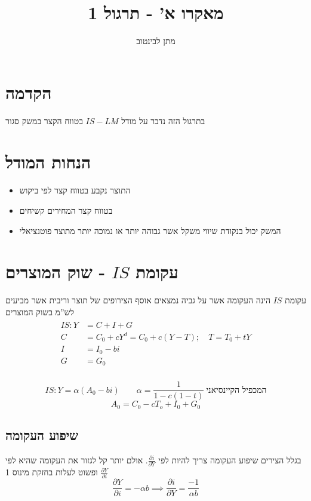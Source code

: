 \documentclass[a4paper,11pt]{article}
\title{מאקרו א' - תרגול 1}
\author{מתן לבינטוב}
\date{}
\begin{document}
\begin{RTL}
    
\maketitle
\section{הקדמה}
בתרגול הזה נדבר על מודל $IS-LM$  בטווח הקצר במשק סגור 
\section{הנחות המודל}
\begin{itemize}
    \item התוצר נקבע בטווח קצר לפי ביקוש
    \item בטווח קצר המחירים קשיחים
    \item המשק יכול בנקודת שיווי משקל אשר גבוהה יותר או נמוכה יותר מתוצר פוטנציאלי
\end{itemize}
\section{עקומת $IS$ - שוק המוצרים}
עקומת $IS$ הינה העקומה אשר על גביה נמצאים אוסף הצירופים של תוצר וריבית אשר מביעים לש''מ בשוק המוצרים
\begin{align*}
    \begin{split}
        IS : Y &= C + I + G \\
        C & = C_0 + cY^d = C_0  + c\left( Y-T \right)  ; \quad T = T_0 + tY \\
        I & =   I_0 - bi \\ 
        G &= G_0 \\ 
    \end{split}
\end{align*}

\begin{equation*}
    IS : Y = \alpha \left( A_0 - bi \right) \qquad \alpha = \frac{1}{1-c(1-t)} \: \text{המכפיל הקיינסיאני}
\end{equation*}
\begin{equation*}
    A_0 = C_0 - cT_o + I_0 + G_0
\end{equation*}

\subsection{שיפוע העקומה}
בגלל הצירים שיפוע העקומה צריך להיות לפי $\frac{\partial i}{\partial Y}$.
אולם יותר קל לגזור את העקומה שהיא לפי $\frac{\partial Y}{\partial i}$ ופשוט לעלות בחזקת מינוס 1
\begin{equation*}
    \frac{\partial Y}{\partial i} = - \alpha b \implies \frac{\partial i}{\partial Y } = \frac{-1}{\alpha b}
 \end{equation*}


\end{RTL}
\end{document}
